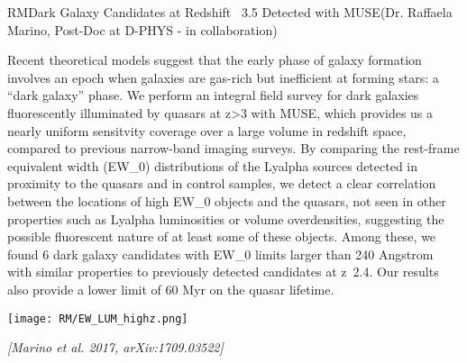 \begin{section}{RM}{Dark Galaxy Candidates at Redshift ~3.5 Detected with
    MUSE}{(Dr. Raffaela Marino, Post-Doc at D-PHYS - in collaboration)}
  \begin{minipage}[l]{\textwidth}

    {\small Recent theoretical models suggest that the early phase of galaxy
      formation involves an epoch when galaxies are gas-rich but inefficient
      at forming stars: a ``dark galaxy'' phase. We perform an integral field
      survey for dark galaxies fluorescently illuminated by quasars at z>3
      with MUSE, which provides us a nearly uniform sensitvity coverage over a
      large volume in redshift space, compared to previous narrow-band imaging
      surveys. By comparing the rest-frame equivalent width (EW\_0)
      distributions of the Lyalpha sources detected in proximity to the
      quasars and in control samples, we detect a clear correlation between
      the locations of high EW\_0 objects and the quasars, not seen in other
      properties such as Lyalpha luminosities or volume overdensities,
      suggesting the possible fluorescent nature of at least some of these
      objects. Among these, we found 6 dark galaxy candidates with EW\_0 limits
      larger than 240 Angstrom with similar properties to previously detected
      candidates at z~2.4. Our results also provide a lower limit of 60 Myr on
      the quasar lifetime.}
  \end{minipage}

  \vspace{0.5cm}

  \begin{minipage}{\linewidth}
    \begin{center}
      \texttt{[image: RM/EW\_LUM\_highz.png]}
    \end{center}
  \end{minipage}

  \vspace{0.5cm}

  {\footnotesize \textit{[Marino et al. 2017, arXiv:1709.03522]}}
\end{section}